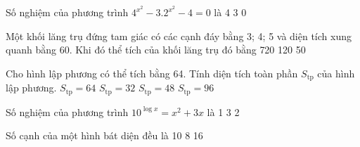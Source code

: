 \begin{ex}%
Số nghiệm của phương trình $4^{x^2}-3.2^{x^2}-4=0$ là
\choice
{4}
{3}
{0}
{}
\end{ex}

\begin{ex}%
Một khối lăng trụ đứng tam giác có các cạnh đáy bằng 3; 4; 5 và diện tích xung quanh bằng 60. Khi đó thể tích của khối lăng trụ đó bằng
\choice
{720}
{120}
{}
{50}
\end{ex}

\begin{ex}%
Cho hình lập phương có thể tích bằng 64. Tính diện tích toàn phần $S_{\mathrm{tp}}$ của hình lập phương.
\choice
{$S_{\mathrm{tp}}=64$}
{$S_{\mathrm{tp}}=32$}
{$S_{\mathrm{tp}}=48$}
{\True $S_{\mathrm{tp}}=96$}
\end{ex}

\begin{ex}%
Số nghiệm của phương trình $10^{\log x}=x^2+3x$ là
\choice
{1}
{3}
{2}
{}
\end{ex}

\begin{ex}%
Số cạnh của một hình bát diện đều là 
\choice
{}
{10}
{8}
{16}
\end{ex}

